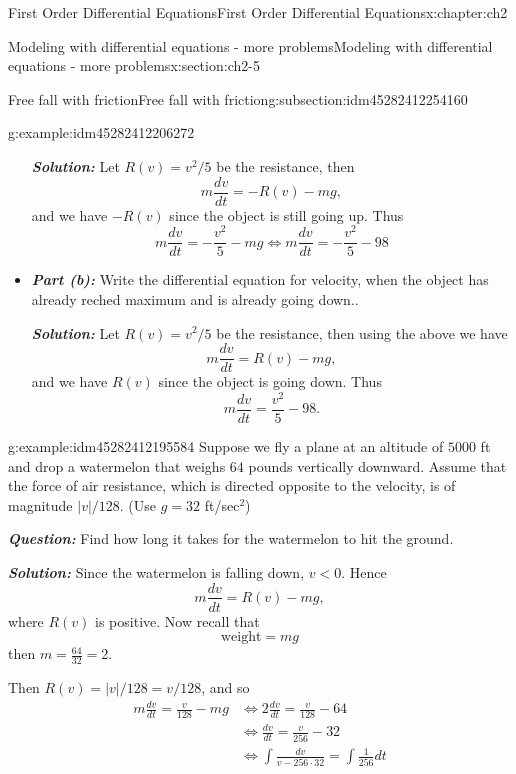 \documentclass[oneside,10pt,]{book}
\newcommand{\alert}[1]{\textbf{\textit{#1}}}
\numberwithin{equation}{section}
\numberwithin{equation}{section}
\newcommand{\lt}{<}
\newcommand{\amp}{&}
\begin{document}
\begin{chapterptx}{First Order Differential Equations}{}{First Order Differential Equations}{}{}{x:chapter:ch2}
\begin{sectionptx}{Modeling with differential equations - more problems}{}{Modeling with differential equations - more problems}{}{}{x:section:ch2-5}
\begin{subsectionptx}{Free fall with friction}{}{Free fall with friction}{}{}{g:subsection:idm45282412254160}
\begin{example}{}{g:example:idm45282412206272}
\begin{itemize}[label=\textbullet]
\alert{Solution:} Let \(R(v)=v^{2}/5\) be the resistance, then%
\begin{equation*}
m\frac{dv}{dt}=-R(v)-mg,
\end{equation*}
and we have \(-R(v)\) since the object is still going up. Thus%
\begin{equation*}
m\frac{dv}{dt}=-\frac{v^{2}}{5}-mg\iff m\frac{dv}{dt}=-\frac{v^{2}}{5}-98
\end{equation*}
%
\item{}\alert{Part (b):} Write the differential equation for velocity, when the object has already reched maximum and is already going down..%
\par
\alert{Solution:} Let \(R(v)=v^{2}/5\) be the resistance, then using the above we have%
\begin{equation*}
m\frac{dv}{dt}=R(v)-mg,
\end{equation*}
and we have \(R(v)\) since the object is going down. Thus%
\begin{equation*}
m\frac{dv}{dt}=\frac{v^{2}}{5}-98.
\end{equation*}
%
\end{itemize}
\end{example}
\begin{example}{}{g:example:idm45282412195584}%
Suppose we fly a plane at an altitude of \(5000\) ft and drop a watermelon that weighs \(64\) pounds vertically downward. Assume that the force of air resistance, which is directed opposite to the velocity, is of magnitude \(\left|v\right|/128\). (Use \(g=32\) ft\slash{}sec\(^2\))%
\par
\alert{Question:} Find how long it takes for the watermelon to hit the ground.%
\par
\alert{Solution:} Since the watermelon is falling down, \(v\lt0\). Hence%
\begin{equation*}
m\frac{dv}{dt}=R(v)-mg,
\end{equation*}
where \(R(v)\) is positive. Now recall that%
\begin{equation*}
\text{weight}=mg
\end{equation*}
then \(m=\frac{64}{32}=2\).%
\par
Then \(R(v)=\left|v\right|/128=v/128\), and so%
\begin{align*}
m\frac{dv}{dt}=\frac{v}{128}-mg \amp \iff2\frac{dv}{dt}=\frac{v}{128}-64\\
\amp \iff\frac{dv}{dt}=\frac{v}{256}-32\\
\amp \iff\int\frac{dv}{v-256\cdot32}=\int\frac{1}{256}dt\\

\end{align*}
\end{example}
\end{subsectionptx}
\end{sectionptx}
\end{chapterptx}
\end{document}
